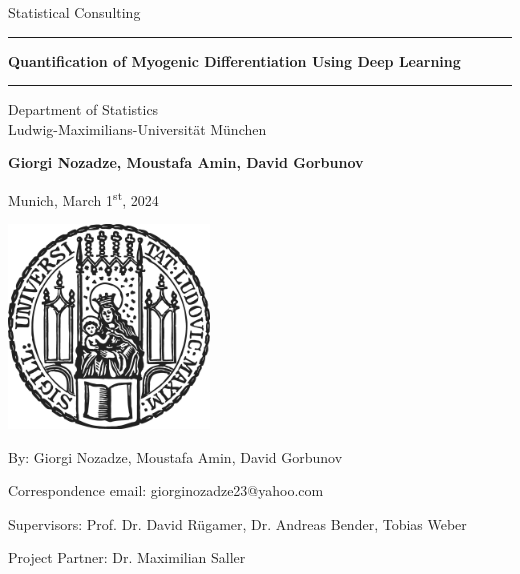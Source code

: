 \documentclass[12pt]{article}
\newcommand{\mytitle}{Quantification of Myogenic Differentiation Using Deep Learning}
\newcommand{\myname}{Giorgi Nozadze, Moustafa Amin, David Gorbunov}
\newcommand{\mysupervisor}{Prof. Dr. David Rügamer, Dr. Andreas Bender, Tobias Weber}
\newcommand{\mypartner}{Dr. Maximilian Saller}
\numberwithin{equation}{section}
\numberwithin{figure}{section}
\begin{document}
	
	
	\begin{titlepage}
		\begin{center}
			
			\LARGE
			Statistical Consulting
			
			\vspace{0.5cm}
			
			\rule{\textwidth}{1.5pt}
			\LARGE
			\textbf{\mytitle}
			\rule{\textwidth}{1.5pt}
			
			\vspace{0.5cm}
			
			\large
			Department of Statistics \\
			Ludwig-Maximilians-Universität München 
			
			\vfill
			
			\Large
			\textbf{\myname}
			
			\vfill
			
			\large
			Munich, March 1\textsuperscript{st}, 2024
			
			\vfill
			
			\includegraphics[width = 0.4\textwidth]{sigillum.png}
			
			\vfill
			
			\normalsize
			By: \myname
						
			Correspondence email: giorginozadze23@yahoo.com
			
			Supervisors: \mysupervisor
						
			Project Partner: \mypartner

			\vfill

			
			
		\end{center}
	\end{titlepage}
 	
 	\listoffigures
 	\listoftables
 	\clearpage
	\tableofcontents
	\newpage
	\setcounter{page}{1}
	\newpage
	
	\newpage
	
	\newpage
	
	\newpage
	
	\newpage
	
	\newpage
	
	\newpage
	
	\newpage
	\printbibliography
	\appendix
	\cleardoublepage
	
\end{document}
